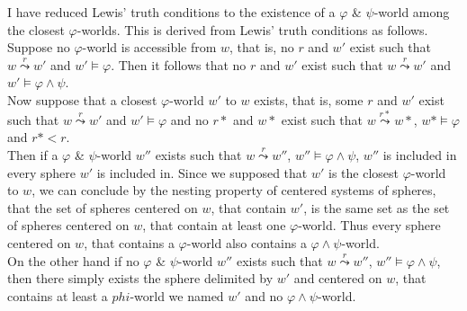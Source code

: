 \documentclass[a4paper,american]{paper}
\theoremstyle{definition}\newtheorem{definition}{Definition}
\begin{document}
	I have reduced Lewis' truth conditions to the existence of a $\varphi$ \& $\psi$-world among the closest $\varphi$-worlds. This is derived from Lewis' truth conditions as follows. \\
	Suppose no $\varphi$-world is accessible from $w$, that is, no $r$ and $w'$ exist such that $w\overset{r}{\leadsto}w'$ and $w'\vDash\varphi$. Then it follows that no $r$ and $w'$ exist such that $w\overset{r}{\leadsto}w'$ and $w'\vDash\varphi\wedge\psi$. \\
	Now suppose that a closest $\varphi$-world $w'$ to $w$ exists, that is, some $r$ and $w'$ exist such that $w\overset{r}{\leadsto}w'$ and $w'\vDash\varphi$ and no $r*$ and $w*$ exist such that $w\overset{r*}{\leadsto}w*$, $w*\vDash\varphi$ and $r*<r$. \\
	Then if a $\varphi$ \& $\psi$-world $w''$ exists such that $w\overset{r}{\leadsto}w''$, $w''\vDash\varphi\wedge\psi$, $w''$ is included in every sphere $w'$ is included in. Since we supposed that $w'$ is the closest $\varphi$-world to $w$, we can conclude by the nesting property of centered systems of spheres, that the set of spheres centered on $w$, that contain $w'$, is the same set as the set of spheres centered on $w$, that contain at least one $\varphi$-world. Thus every sphere centered on $w$, that contains a $\varphi$-world also contains a $\varphi\wedge\psi$-world. \\
	On the other hand if no $\varphi$ \& $\psi$-world $w''$ exists such that $w\overset{r}{\leadsto}w''$, $w''\vDash\varphi\wedge\psi$, then there simply exists the sphere delimited by $w'$ and centered on $w$, that contains at least a $phi$-world we named $w'$ and no $\varphi\wedge\psi$-world. \\
	
\end{document}
